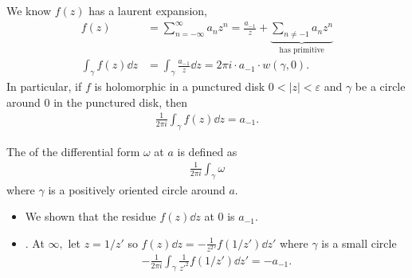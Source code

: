 \documentclass[a4paper,12pt]{article}
\begin{document}
We know $f(z)$ has a laurent expansion, \begin{align}
    f(z)&=\sum_{n=-\infty}^\infty a_nz^n=\frac{a_{-1}}{z}+\underbrace{\sum_{n\neq-1}a_nz^n}_{\text{has primitive}}\\
    \int_\gamma f(z)\dd z&=\int_\gamma\frac{a_{-1}}{z}\dd z=2\pi i\cdot a_{-1}\cdot w(\gamma,0).
\end{align}
In particular, if $f$ is holomorphic in a punctured disk $0<|z|<\varepsilon$ and $\gamma$ be a circle around $0$ in the punctured disk, then \begin{align}
    \frac{1}{2\pi i}\int_\gamma f(z)\dd z=a_{-1}.
\end{align}
\begin{definition}[Residue]
    The  of the differential form $\omega$ at $a$ is defined as \begin{align}
        \frac{1}{2\pi i}\int_\gamma\omega
    \end{align}
    where $\gamma$ is a positively oriented circle around $a.$
\end{definition}
\begin{itemize}
    \item We shown that the residue $f(z)\dd z$ at $0$ is $a_{-1}.$
    \item {}. At $\infty,$ let $z=1/z'$ so $f(z)\dd z=-\frac{1}{{z^2}'}{f(1/z')\dd z'}$ where $\gamma$ is a small circle \begin{align}
        -\frac{1}{2\pi i}\int_\gamma\frac{1}{{z'}^2}f(1/z')\dd z'=-a_{-1}.
    \end{align}
\end{itemize}
\end{document}

